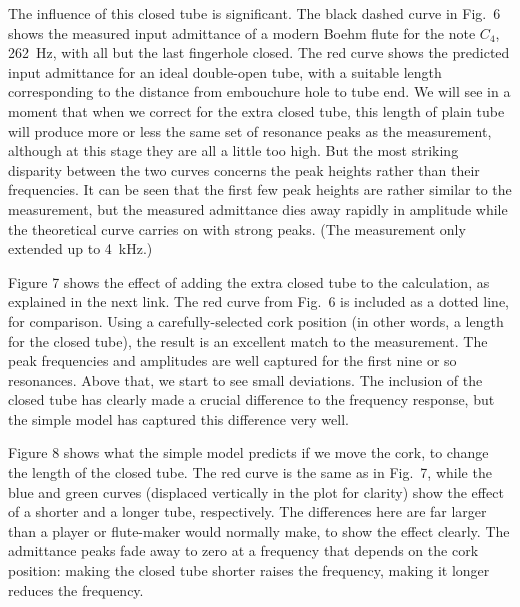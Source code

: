   The influence of this closed tube is significant. The black dashed curve in 
  Fig.\ 6 shows the measured input admittance of a modern Boehm flute for the 
  note $C_4$, 262~Hz, with all but the last fingerhole closed. The red curve 
  shows the predicted input admittance for an ideal double-open tube, with a 
  suitable length corresponding to the distance from embouchure hole to tube 
  end. We will see in a moment that when we correct for the extra closed tube, 
  this length of plain tube will produce more or less the same set of resonance 
  peaks as the measurement, although at this stage they are all a little too 
  high. But the most striking disparity between the two curves concerns the 
  peak heights rather than their frequencies. It can be seen that the first few 
  peak heights are rather similar to the measurement, but the measured 
  admittance dies away rapidly in amplitude while the theoretical curve carries 
  on with strong peaks. (The measurement only extended up to 4~kHz.) 

  Figure 7 shows the effect of adding the extra closed tube to the calculation, 
  as explained in the next link. The red curve from Fig.\ 6 is included as a 
  dotted line, for comparison. Using a carefully-selected cork position (in 
  other words, a length for the closed tube), the result is an excellent match 
  to the measurement. The peak frequencies and amplitudes are well captured for 
  the first nine or so resonances. Above that, we start to see small 
  deviations. The inclusion of the closed tube has clearly made a crucial 
  difference to the frequency response, but the simple model has captured this 
  difference very well. 


  Figure 8 shows what the simple model predicts if we move the cork, to change 
  the length of the closed tube. The red curve is the same as in Fig.\ 7, while 
  the blue and green curves (displaced vertically in the plot for clarity) show 
  the effect of a shorter and a longer tube, respectively. The differences here 
  are far larger than a player or flute-maker would normally make, to show the 
  effect clearly. The admittance peaks fade away to zero at a frequency that 
  depends on the cork position: making the closed tube shorter raises the 
  frequency, making it longer reduces the frequency. 

